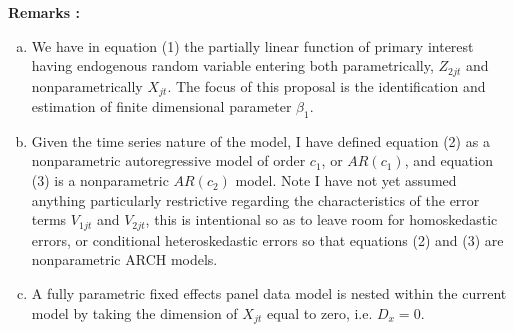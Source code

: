 \documentclass[10pt]{article}
\begin{document}
\noindent \bf Remarks \rm: 
\begin{enumerate}[a.)] 
 \item We have in equation (1) the partially linear function of primary interest having endogenous random variable entering both parametrically, $Z_{2jt}$ and nonparametrically $X_{jt}$. The focus of this proposal is the identification and estimation of finite dimensional parameter $\beta_1$. 
 \item Given the time series nature of the model, I have defined equation (2) as a nonparametric autoregressive model of order $c_1$, or  $AR(c_1)$, and equation (3) is a nonparametric $AR(c_2)$ model. Note I have not yet assumed anything particularly restrictive regarding the characteristics of the error terms $V_{1jt}$ and $V_{2jt}$, this is intentional so as to leave room for homoskedastic errors, or conditional heteroskedastic errors so that equations (2) and (3) are nonparametric ARCH models. 
 \item A fully parametric fixed effects panel data model is nested within the current model by taking the dimension of $X_{jt}$ equal to zero, i.e. $D_x =0$. 
\end{enumerate}
\end{document}

